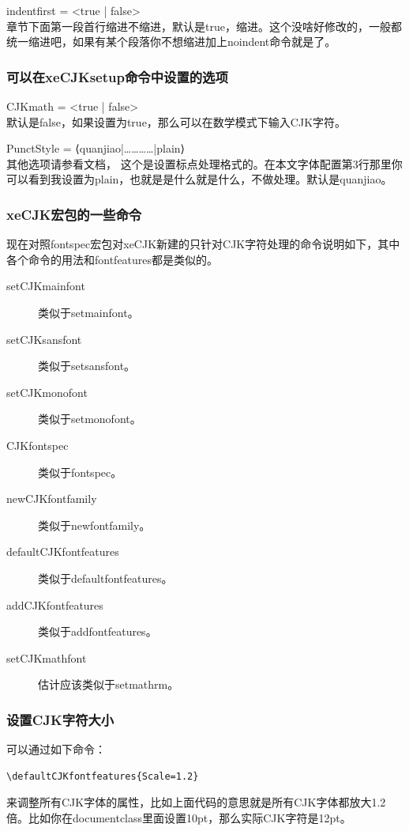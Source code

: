 \documentclass[12pt,oneside]{book}
\begin{document}
\begin{common-format}
indentfirst = <true | false>\\
章节下面第一段首行缩进不缩进，默认是true，缩进。这个没啥好修改的，一般都统一缩进吧，如果有某个段落你不想缩进加上noindent命令就是了。

\subsubsection{可以在xeCJKsetup命令中设置的选项}
CJKmath = <true | false>\\
默认是false，如果设置为true，那么可以在数学模式下输入CJK字符。

PunctStyle = {⟨quanjiao|…………|plain⟩}\\
其他选项请参看文档， 这个是设置标点处理格式的。在本文字体配置第3行那里你可以看到我设置为plain，也就是是什么就是什么，不做处理。默认是quanjiao。

\subsubsection{xeCJK宏包的一些命令}
现在对照fontspec宏包对xeCJK新建的只针对CJK字符处理的命令说明如下，其中各个命令的用法和fontfeatures都是类似的。
\begin{description}
\item[setCJKmainfont] 类似于setmainfont。
\item[setCJKsansfont] 类似于setsansfont。
\item[setCJKmonofont] 类似于setmonofont。
\item[CJKfontspec] 类似于fontspec。
\item[newCJKfontfamily] 类似于newfontfamily。
\item[defaultCJKfontfeatures] 类似于defaultfontfeatures。
\item[addCJKfontfeatures] 类似于addfontfeatures。
\item[setCJKmathfont] 估计应该类似于setmathrm。
\end{description}

\subsubsection{设置CJK字符大小}
可以通过如下命令：
\begin{Verbatim}
\defaultCJKfontfeatures{Scale=1.2}   
\end{Verbatim}
来调整所有CJK字体的属性，比如上面代码的意思就是所有CJK字体都放大1.2倍。比如你在documentclass里面设置10pt，那么实际CJK字符是12pt。




\end{common-format}
\end{document}
